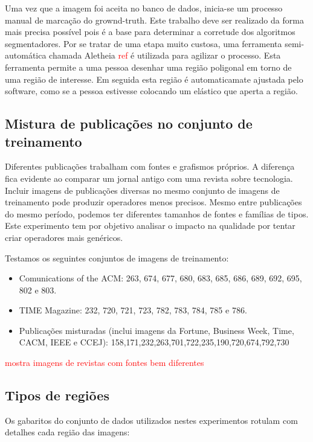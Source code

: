 \documentclass[a4paper,11pt]{article}
\newcommand{\TODO}[1]{\textcolor{red}{#1}}
\begin{document}
    Uma vez que a imagem foi aceita no banco de dados, inicia-se um processo manual de marcação do grownd-truth. Este trabalho deve ser realizado da forma mais precisa possível pois é a base para determinar a corretude dos algoritmos segmentadores. Por se tratar de uma etapa muito custosa, uma ferramenta semi-automática chamada Aletheia \TODO{ref} é utilizada para agilizar o processo. Esta ferramenta permite a uma pessoa desenhar uma região poligonal em torno de uma região de interesse. Em seguida esta região é automaticamate ajustada pelo software, como se a pessoa estivesse colocando um elástico que aperta a região.

  \subsection{Mistura de publicações no conjunto de treinamento}

    Diferentes publicações trabalham com fontes e grafismos próprios. A diferença fica evidente ao comparar um jornal antigo com uma revista sobre tecnologia. Incluir imagens de publicações diversas no mesmo conjunto de imagens de treinamento pode produzir operadores menos precisos. Mesmo entre publicações do mesmo período, podemos ter diferentes tamanhos de fontes e famílias de tipos. Este experimento tem por objetivo analisar o impacto na qualidade por tentar criar operadores mais genéricos.

    Testamos os seguintes conjuntos de imagens de treinamento:

    \begin{itemize}
      \item Comunications of the ACM: 263, 674, 677, 680, 683, 685, 686, 689, 692, 695, 802 e 803.
      \item TIME Magazine: 232, 720, 721, 723, 782, 783, 784, 785 e 786.
      \item Publicações misturadas (inclui imagens da Fortune, Business Week, Time, CACM, IEEE e CCEJ): 158,171,232,263,701,722,235,190,720,674,792,730
    \end{itemize}

    \TODO{mostra imagens de revistas com fontes bem diferentes}

  \subsection{Tipos de regiões}

    Os gabaritos do conjunto de dados utilizados nestes experimentos rotulam com detalhes cada região das imagens:
\end{document}
